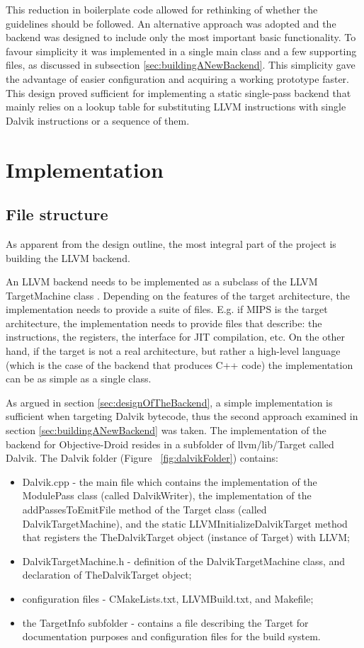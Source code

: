 \documentclass[parskip]{cs4rep}
\begin{document}
This reduction in boilerplate code allowed for rethinking of whether the guidelines should be followed. An alternative approach was adopted and the backend was designed to include only the most important basic functionality. To favour simplicity it was implemented in a single main class and a few supporting files, as discussed in subsection \ref{sec:buildingANewBackend}. This simplicity gave the advantage of easier configuration and acquiring a working prototype faster. This design proved sufficient for implementing a static single-pass backend that mainly relies on a lookup table for substituting LLVM instructions with single Dalvik instructions or a sequence of them.

\section{Implementation} \label{sec:Implementation}

\subsection{File structure}

As apparent from the design outline, the most integral part of the project is building the LLVM backend.

An LLVM backend needs to be implemented as a subclass of the LLVM TargetMachine class \cite{P8}. Depending on the features of the target architecture, the implementation needs to provide a suite of files. E.g. if MIPS is the target architecture, the implementation needs to provide files that describe: the instructions, the registers, the interface for JIT compilation, etc. On the other hand, if the target is not a real architecture, but rather a high-level language (which is the case of the backend that produces C++ code) the implementation can be as simple as a single class.

As argued in section \ref{sec:designOfTheBackend}, a simple implementation is sufficient when targeting Dalvik bytecode, thus the second approach examined in section \ref{sec:buildingANewBackend} was taken. The implementation of the backend for Objective-Droid resides in a subfolder of llvm/lib/Target called Dalvik. The Dalvik folder (Figure ~\ref{fig:dalvikFolder}) contains: 
\begin{itemize}
\item Dalvik.cpp - the main file which contains the implementation of the ModulePass class (called DalvikWriter), the implementation of the addPassesToEmitFile method of the Target class (called DalvikTargetMachine), and the static LLVMInitializeDalvikTarget method that registers the TheDalvikTarget object (instance of Target) with LLVM;
\item DalvikTargetMachine.h - definition of the DalvikTargetMachine class, and declaration of TheDalvikTarget object;
\item configuration files - CMakeLists.txt, LLVMBuild.txt, and Makefile;
\item the TargetInfo subfolder - contains a file describing the Target for documentation purposes and configuration files for the build system.
\end{itemize}
\end{document}
